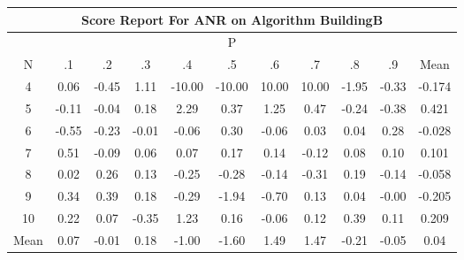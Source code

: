\documentclass[11pt,a4paper]{report}
\begin{document}
\begin{longtable}{ | c || c | c | c | c | c | c | c | c | c || c |}
\hline
\multicolumn{11}{|c|}{ Score Report For ANR on Algorithm BuildingB} \\
\hline
\multicolumn{11}{|c|}{ P } \\
\hline
N & .1 & .2 & .3 & .4 & .5 & .6 & .7 & .8 & .9 & Mean\\
 \hline
 \hline
 \endhead
  4 &  \cellcolor[HTML]{FFFFFF} 0.06 &  \cellcolor[HTML]{FFF7F7} -0.45 &  \cellcolor[HTML]{E7E7FF} 1.11 &  \cellcolor[HTML]{FF0000} -10.00 &  \cellcolor[HTML]{FF0000} -10.00 &  \cellcolor[HTML]{0808FF} 10.00 &  \cellcolor[HTML]{0808FF} 10.00 &  \cellcolor[HTML]{FFCFCF} -1.95 &  \cellcolor[HTML]{FFF7F7} -0.33 & -0.174 \\
  5 &  \cellcolor[HTML]{FFFFFF} -0.11 &  \cellcolor[HTML]{FFFFFF} -0.04 &  \cellcolor[HTML]{F7F7FF} 0.18 &  \cellcolor[HTML]{C7C7FF} 2.29 &  \cellcolor[HTML]{F7F7FF} 0.37 &  \cellcolor[HTML]{DFDFFF} 1.25 &  \cellcolor[HTML]{F7F7FF} 0.47 &  \cellcolor[HTML]{FFF7F7} -0.24 &  \cellcolor[HTML]{FFF7F7} -0.38 & 0.421 \\
  6 &  \cellcolor[HTML]{FFEFEF} -0.55 &  \cellcolor[HTML]{FFF7F7} -0.23 &  \cellcolor[HTML]{FFFFFF} -0.01 &  \cellcolor[HTML]{FFFFFF} -0.06 &  \cellcolor[HTML]{F7F7FF} 0.30 &  \cellcolor[HTML]{FFFFFF} -0.06 &  \cellcolor[HTML]{FFFFFF} 0.03 &  \cellcolor[HTML]{FFFFFF} 0.04 &  \cellcolor[HTML]{F7F7FF} 0.28 & -0.028 \\
  7 &  \cellcolor[HTML]{EFEFFF} 0.51 &  \cellcolor[HTML]{FFFFFF} -0.09 &  \cellcolor[HTML]{FFFFFF} 0.06 &  \cellcolor[HTML]{FFFFFF} 0.07 &  \cellcolor[HTML]{F7F7FF} 0.17 &  \cellcolor[HTML]{FFFFFF} 0.14 &  \cellcolor[HTML]{FFFFFF} -0.12 &  \cellcolor[HTML]{FFFFFF} 0.08 &  \cellcolor[HTML]{FFFFFF} 0.10 & 0.101 \\
  8 &  \cellcolor[HTML]{FFFFFF} 0.02 &  \cellcolor[HTML]{F7F7FF} 0.26 &  \cellcolor[HTML]{FFFFFF} 0.13 &  \cellcolor[HTML]{FFF7F7} -0.25 &  \cellcolor[HTML]{FFF7F7} -0.28 &  \cellcolor[HTML]{FFFFFF} -0.14 &  \cellcolor[HTML]{FFF7F7} -0.31 &  \cellcolor[HTML]{F7F7FF} 0.19 &  \cellcolor[HTML]{FFFFFF} -0.14 & -0.058 \\
  9 &  \cellcolor[HTML]{F7F7FF} 0.34 &  \cellcolor[HTML]{F7F7FF} 0.39 &  \cellcolor[HTML]{F7F7FF} 0.18 &  \cellcolor[HTML]{FFF7F7} -0.29 &  \cellcolor[HTML]{FFCFCF} -1.94 &  \cellcolor[HTML]{FFEFEF} -0.70 &  \cellcolor[HTML]{FFFFFF} 0.13 &  \cellcolor[HTML]{FFFFFF} 0.04 &  \cellcolor[HTML]{FFFFFF} -0.00 & -0.205 \\
  10 &  \cellcolor[HTML]{F7F7FF} 0.22 &  \cellcolor[HTML]{FFFFFF} 0.07 &  \cellcolor[HTML]{FFF7F7} -0.35 &  \cellcolor[HTML]{DFDFFF} 1.23 &  \cellcolor[HTML]{F7F7FF} 0.16 &  \cellcolor[HTML]{FFFFFF} -0.06 &  \cellcolor[HTML]{FFFFFF} 0.12 &  \cellcolor[HTML]{F7F7FF} 0.39 &  \cellcolor[HTML]{FFFFFF} 0.11 & 0.209 \\
 \hline
 \hline
Mean &  \cellcolor[HTML]{FFFFFF} 0.07 &  \cellcolor[HTML]{FFFFFF} -0.01 &  \cellcolor[HTML]{F7F7FF} 0.18 &  \cellcolor[HTML]{FFE7E7} -1.00 &  \cellcolor[HTML]{FFD7D7} -1.60 &  \cellcolor[HTML]{D7D7FF} 1.49 &  \cellcolor[HTML]{D7D7FF} 1.47 &  \cellcolor[HTML]{FFF7F7} -0.21 &  \cellcolor[HTML]{FFFFFF} -0.05 &  \cellcolor[HTML]{FFFFFF} 0.04
\end{longtable}
\end{document}
